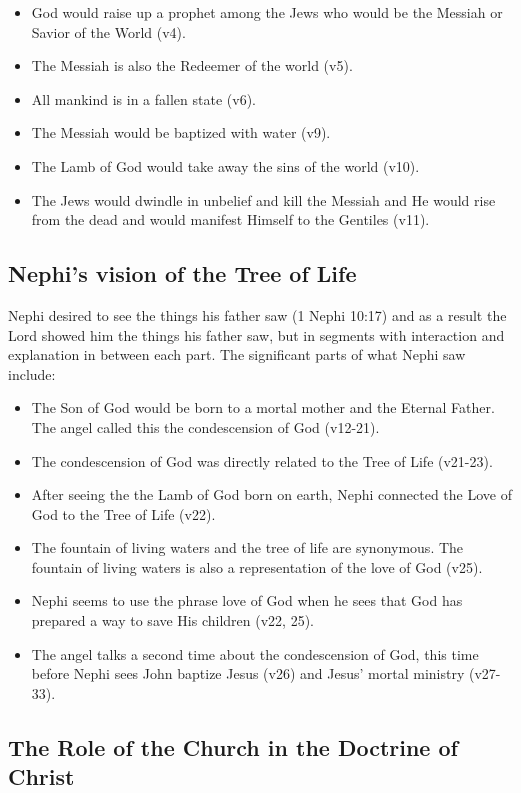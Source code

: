 \begin{itemize}
  \item{God would raise up a prophet among the Jews who would be the Messiah or Savior of the World (v4).}
  \item{The Messiah is also the Redeemer of the world (v5).}
  \item{All mankind is in a fallen state (v6).}
  \item{The Messiah would be baptized with water (v9).}
  \item{The Lamb of God would take away the sins of the world (v10).}
  \item{The Jews would dwindle in unbelief and kill the Messiah and He would rise from the dead and would manifest Himself to the Gentiles (v11).}
\end{itemize}

\subsection{Nephi's vision of the Tree of Life}

Nephi desired to see the things his father saw (1 Nephi 10:17) and as a result the Lord showed him the things his father saw, but in segments with interaction and explanation in between each part. The significant parts of what Nephi saw include:

\begin{itemize}
  \item{The Son of God would be born to a mortal mother and the Eternal Father. The angel called this the condescension of God (v12-21).}
  \item{The condescension of God was directly related to the Tree of Life (v21-23).}
  \item After seeing the the Lamb of God born on earth, Nephi connected the Love of God to the Tree of Life (v22).
  \item The fountain of living waters and the tree of life are synonymous. The fountain of living waters is also a representation of the love of God (v25).
  \item Nephi seems to use the phrase love of God when he sees that God has prepared a way to save His children (v22, 25).
  \item The angel talks a second time about the condescension of God, this time before Nephi sees John baptize Jesus (v26) and Jesus' mortal ministry (v27-33).
\end{itemize}

\subsection{The Role of the Church in the Doctrine of Christ}

